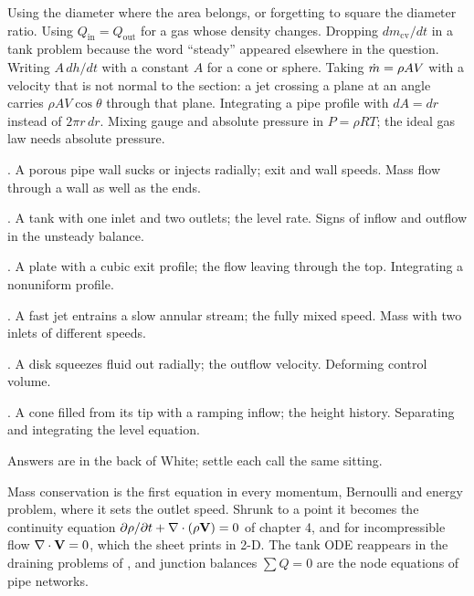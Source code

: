 \begin{trap}
Using the diameter where the area belongs, or forgetting to square the diameter ratio. Using $Q_\text{in} = Q_\text{out}$ for a gas whose density changes. Dropping $dm_\text{cv}/dt$ in a tank problem because the word ``steady'' appeared elsewhere in the question. Writing $A\,dh/dt$ with a constant $A$ for a cone or sphere. Taking $\dot m = \rho AV$ with a velocity that is not normal to the section: a jet crossing a plane at an angle carries $\rho AV\cos\theta$ through that plane. Integrating a pipe profile with $dA = dr$ instead of $2\pi r\,dr$. Mixing gauge and absolute pressure in $P = \rho RT$; the ideal gas law needs absolute pressure.
\end{trap}

\begin{ladder}
\item {}. A porous pipe wall sucks or injects radially; exit and wall speeds. Mass flow through a wall as well as the ends.
\item {}. A tank with one inlet and two outlets; the level rate. Signs of inflow and outflow in the unsteady balance.
\item {}. A plate with a cubic exit profile; the flow leaving through the top. Integrating a nonuniform profile.
\item {}. A fast jet entrains a slow annular stream; the fully mixed speed. Mass with two inlets of different speeds.
\item {}. A disk squeezes fluid out radially; the outflow velocity. Deforming control volume.
\item {}. A cone filled from its tip with a ramping inflow; the height history. Separating and integrating the level equation.
\end{ladder}
Answers are in the back of White; settle each call the same sitting.


\begin{hides}
Mass conservation is the first equation in every momentum, Bernoulli and energy problem, where it sets the outlet speed. Shrunk to a point it becomes the continuity equation $\partial\rho/\partial t + \nabla\cdot(\rho\mathbf{V}) = 0$ of chapter 4, and for incompressible flow $\nabla\cdot\mathbf{V} = 0$, which the sheet prints in 2-D. The tank ODE reappears in the draining problems of , and junction balances $\sum Q = 0$ are the node equations of pipe networks.
\end{hides}

